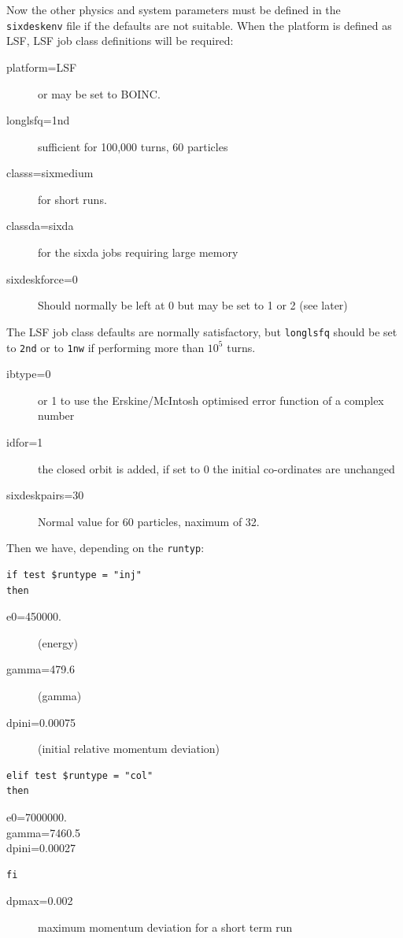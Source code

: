 \documentclass{cernatsnote}
\begin{document}
Now the other physics and system parameters must be defined in the {\tt
sixdeskenv} file if the defaults are not suitable.  When the platform is
defined as LSF, LSF job class definitions will be required:
\begin{description}
\item[platform=LSF] or may be set to BOINC.
\item[longlsfq=1nd] sufficient for 100,000 turns, 60 particles
\item[classs=sixmedium] for short runs.
\item[classda=sixda] for the sixda jobs requiring large memory
\item[sixdeskforce=0] Should normally be left at 0 but may be set to 1 or 2 (see later)
\end{description}
The LSF job class defaults are normally satisfactory, but {\tt longlsfq}
should be set to {\tt 2nd} or to {\tt 1nw} if performing more than $10^5$ turns.

\begin{description}
\item[ibtype=0] or 1 to use the Erskine/McIntosh optimised error function
of a complex number
\item[idfor=1] the closed orbit is added, if set to 0 the initial co-ordinates are unchanged
\item[sixdeskpairs=30] Normal value for 60 particles, naximum of 32. 
\end{description}

Then we have, depending on the {\tt runtyp}:
\begin{verbatim}
if test $runtype = "inj"
then
\end{verbatim}
\begin{description}
\item[e0=450000.] (energy)
\item[gamma=479.6] (gamma)
\item[dpini=0.00075] (initial relative momentum deviation)
\end{description}
\begin{verbatim}
elif test $runtype = "col"
then
\end{verbatim}
\begin{description}
\item[e0=7000000.]
\item[gamma=7460.5]
\item[dpini=0.00027]
\end{description}
\begin{verbatim}
fi
\end{verbatim}
\begin{description}
\item[dpmax=0.002] maximum momentum deviation for a short term run
\end{description}
\end{document}
